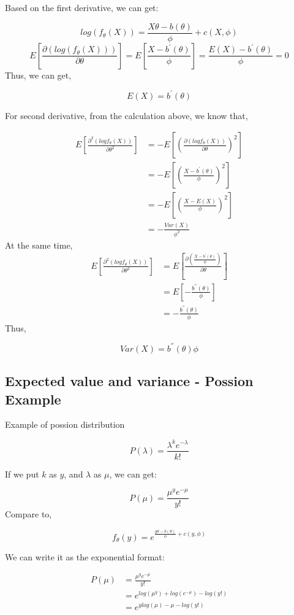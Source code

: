 \documentclass[]{book}
\begin{document}
Based on the first derivative, we can get:

\[log(f_{\theta}(X))=\frac{X\theta-b(\theta)}{\phi}+c(X,\phi)\]
\[E[\frac{\partial (log(f_{\theta}(X)))}{\partial \theta}]= E[\frac{X-b^{'}(\theta)}{\phi}]=\frac{E(X)-b^{'}(\theta)}{\phi}=0\]
Thus, we can get,

\[E(X)=b^{'}(\theta)\]

For second derivative, from the calculation above, we know that,

\[\begin{aligned} E[\frac{\partial^2 (logf_{\theta}(X))}{\partial \theta^2}]&=-E[(\frac{\partial (logf_{\theta}(X))}{\partial \theta})^2] \\ &= -E[(\frac{X-b^{'}(\theta)}{\phi})^2]\\ &=-E[(\frac{X-E(X)}{\phi})^2] \\ &= -\frac{Var(X)}{\phi^2}\end{aligned}\]
At the same time,
\[\begin{aligned} E[\frac{\partial^2 (logf_{\theta}(X))}{\partial \theta^2}]&=E[\frac{\partial (\frac{X-b^{'}(\theta)}{\phi})}{\partial \theta}] \\ &= E[-\frac{b^{''}(\theta)}{\phi}]\\ &= - \frac{b^{''}(\theta)}{\phi} \end{aligned}\]
Thus,

\[Var(X)=b^{''}(\theta) \phi\]

\hypertarget{expected-value-and-variance---possion-example}{%
\subsection{Expected value and variance - Possion Example}\label{expected-value-and-variance---possion-example}}

Example of possion distribution

\[P(\lambda)=\frac{\lambda^k e^{-\lambda}}{k!}\]

If we put \(k\) as \(y\), and \(\lambda\) as \(\mu\), we can get:

\[P(\mu)=\frac{\mu^y e^{-\mu}}{y!}\]
Compare to,

\[f_{\theta}(y)=e^{\frac{y\theta-b(\theta)}{\phi}+c(y,\phi)}\]

We can write it as the exponential format:

\[\begin{aligned} P(\mu) &=\frac{\mu^y e^{-\mu}}{y!}  \\ &= e^{log(\mu^y)+log(e^{-\mu})-log(y!)} \\ &= e^{ylog(\mu)-\mu-log(y!)}\end{aligned}\]
\end{document}
